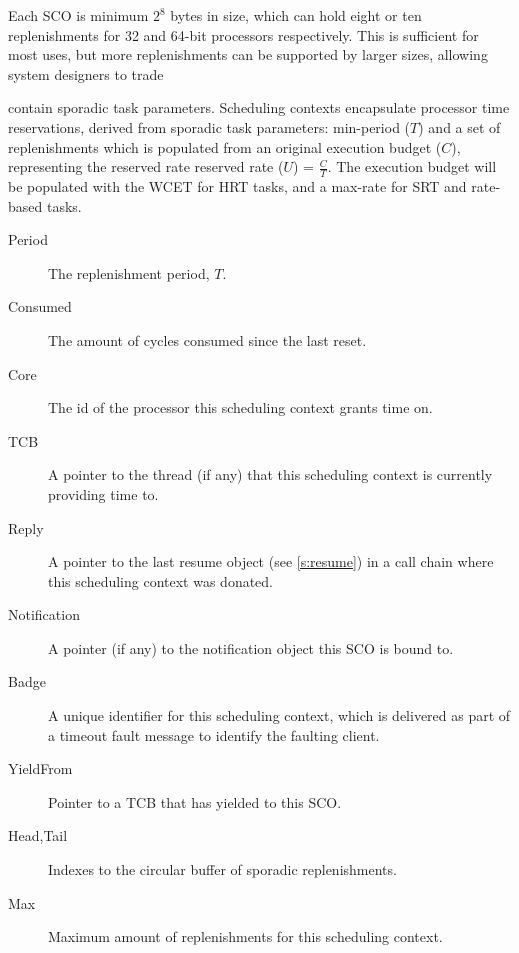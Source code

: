 Each \gls{SCO} is minimum $2^{8}$ bytes in size, which can hold eight or ten replenishments for 32
and 64-bit processors respectively. This is sufficient for most uses, but more replenishments can
be supported by larger sizes, allowing system designers to trade




contain sporadic task parameters.  Scheduling contexts encapsulate processor time reservations,
derived from sporadic task parameters: min-period ($T$) and a set of replenishments which is
populated from an original execution budget ($C$), representing the reserved rate reserved rate
($U$) = $\frac{C}{T}$.  The execution budget will be populated with the \gls{WCET} for \gls{HRT}
tasks, and a max-rate for \gls{SRT} and rate-based tasks.




\begin{description}
    \item[Period] The replenishment period, $T$.
    \item[Consumed] The amount of cycles consumed since the last reset.
    \item[Core] The id of the processor this scheduling context grants time on.
    \item[TCB] A pointer to the thread (if any) that this scheduling context is currently providing time to.
    \item[Reply] A pointer to the last resume object (see \cref{s:resume}) in a call chain where
        this scheduling context was donated.
    \item[Notification] A pointer (if any) to the notification object this \gls{SCO} is bound to.
    \item[Badge] A unique identifier for this scheduling context, which is delivered as part of a
        timeout fault message to identify the faulting client.
    \item[YieldFrom] Pointer to a \gls{TCB} that has yielded to this \gls{SCO}.
    \item[Head,Tail] Indexes to the circular buffer of sporadic replenishments.
    \item[Max] Maximum amount of replenishments for this scheduling context.
\end{description}



